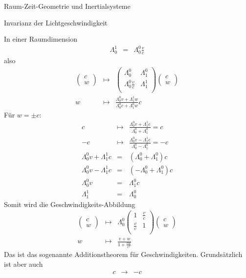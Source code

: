 \begin{chapter}{\titlestr}
\begin{section}{Raum-Zeit-Geometrie und Inertialsysteme}
\begin{subsection}{Invarianz der Lichtgeschwindigkeit}
\begin{subsubsection}{In einer Raumdimension}
\begin{eqnarray*}
\Lambda^1_0 &=& \Lambda^0_0\frac{v}{c}
\end{eqnarray*}
also
\begin{eqnarray*}
\begin{pmatrix}
c\\
w
\end{pmatrix}
&\mapsto&
\begin{pmatrix}
\Lambda^0_0 &\Lambda^0_1\\
\Lambda^0_0\frac{v}{c} &\Lambda^1_1\\
\end{pmatrix}
\begin{pmatrix}
c\\
w
\end{pmatrix}\\
w &\mapsto& \frac{\Lambda^0_0v +\Lambda^1_1w}{\Lambda^0_0c+\Lambda^0_1w}c
\end{eqnarray*}
Für $w=\pm c$:
\begin{eqnarray*}
c &\mapsto& \frac{\Lambda^0_0v +\Lambda^1_1c}{\Lambda^0_0+\Lambda^0_1}=c\\
-c &\mapsto& \frac{\Lambda^0_0v -\Lambda^1_1c}{\Lambda^0_0-\Lambda^0_1}=-c\\
\Lambda^0_0v +\Lambda^1_1c &=& \left(\Lambda^0_0+\Lambda^0_1\right)c\\
\Lambda^0_0v -\Lambda^1_1c &=& \left(-\Lambda^0_0+\Lambda^0_1\right)c\\
\Lambda^0_0v &=&  \Lambda^0_1c\\
\Lambda^1_1 &=& \Lambda^0_0
\end{eqnarray*}
Somit wird die Geschwindigkeits-Abbildung
\begin{eqnarray*}
\begin{pmatrix}
c\\
w
\end{pmatrix}
&\mapsto&
\Lambda^0_0
\begin{pmatrix}
1 &\frac{v}{c}\\
\frac{v}{c} &1\\
\end{pmatrix}
\begin{pmatrix}
c\\
w
\end{pmatrix}\\
w &\mapsto& \frac{v +w}{1+\frac{vw}{c^2}}
\end{eqnarray*}
Das ist das sogenannte Additionstheorem für Geschwindigkeiten.
Grundsätzlich ist aber auch
\begin{eqnarray*}
c &\rightarrow& -c\\

\end{eqnarray*}
\end{subsubsection}
\end{subsection}
\end{section}
\end{chapter}
